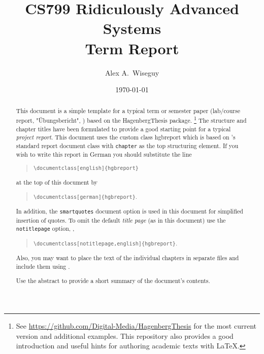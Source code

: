 \documentclass[english,notitlepage,smartquotes]{hgbreport}
\begin{document}

\author{Alex A.\ Wiseguy}                    %
\title{CS799 Ridiculously Advanced Systems\\ %
			Term Report}	                 %
\date{\today}

\maketitle

\begin{abstract}\noindent
This document is a simple template for a typical term or semester paper
(lab/course report, "Übungsbericht", \etc) based on the \textsf{HagenbergThesis}
\latex package.%
\footnote{See \url{https://github.com/Digital-Media/HagenbergThesis} for the
	most current version and additional examples. This repository also provides
	a good introduction and useful hints for authoring academic texts with
	LaTeX.}
The structure and chapter titles have been formulated to provide a good
starting point for a typical \emph{project report}. This document uses the
custom class \textsf{hgbreport} which is based on \latex's standard
\textsf{report} document class with \texttt{chapter} as the top structuring
element. If you wish to write this report in German you should substitute the
line
%
\begin{quote}
	\verb!\documentclass[english]{hgbreport}! 
\end{quote}
%
at the top of this document by
%
\begin{quote}
	\verb!\documentclass[german]{hgbreport}!.
\end{quote}
%
In addition, the \texttt{smartquotes} document option is used in this document
for simplified insertion of quotes. To omit the default \emph{title page}
(as in this document) use the \texttt{notitlepage} option, \eg,
%
\begin{quote}
	\verb!\documentclass[notitlepage,english]{hgbreport}!.
\end{quote}
%
Also, you may want to place the text of the individual chapters in separate
files and include them using \verb!!.

\bigskip
\noindent
Use the abstract to provide a short summary of the document's contents.
\end{abstract}
\end{document}
